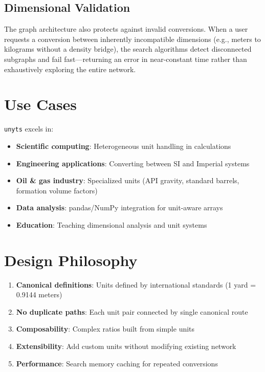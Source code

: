 \documentclass[11pt,a4paper]{report}
\begin{document}
\subsection{Dimensional Validation}
The graph architecture also protects against invalid conversions. When a user requests a conversion between inherently incompatible dimensions (e.g., meters to kilograms without a density bridge), the search algorithms detect disconnected subgraphs and fail fast---returning an error in near-constant time rather than exhaustively exploring the entire network.

\section{Use Cases}

\texttt{unyts} excels in:
\begin{itemize}[leftmargin=*]
  \item \textbf{Scientific computing}: Heterogeneous unit handling in calculations
  \item \textbf{Engineering applications}: Converting between SI and Imperial systems
  \item \textbf{Oil \& gas industry}: Specialized units (API gravity, standard barrels, formation volume factors)
  \item \textbf{Data analysis}: pandas/NumPy integration for unit-aware arrays
  \item \textbf{Education}: Teaching dimensional analysis and unit systems
\end{itemize}

\section{Design Philosophy}

\begin{enumerate}[leftmargin=*]
  \item \textbf{Canonical definitions}: Units defined by international standards (1 yard = 0.9144 meters)
  \item \textbf{No duplicate paths}: Each unit pair connected by single canonical route
  \item \textbf{Composability}: Complex ratios built from simple units
  \item \textbf{Extensibility}: Add custom units without modifying existing network
  \item \textbf{Performance}: Search memory caching for repeated conversions
\end{enumerate}
\end{document}
